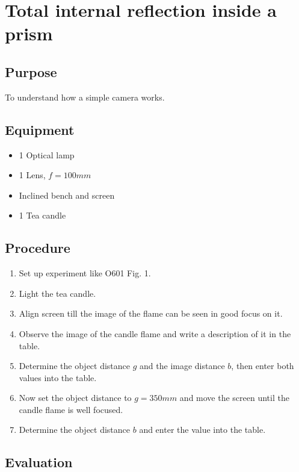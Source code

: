 \documentclass[12pt]{article}
\begin{document}
\section*{Total internal reflection inside a prism}

\subsection*{Purpose}

To understand how a simple camera works.

\subsection*{Equipment}

\begin{itemize}
\item 1 Optical lamp
\item 1 Lens, $f=100 mm$
\item Inclined bench and screen
\item 1 Tea candle
\end{itemize}

\subsection*{Procedure}

\begin{enumerate}
\item Set up experiment like O601 Fig. 1.
\item Light the tea candle.
\item Align screen till the image of the flame can be seen in good focus on it.
\item Observe the image of the candle flame and write a description of it in the table.
\item Determine the object distance $g$ and the image distance $b$, then enter both values into the table.
\item Now set the object distance to $g=350mm$ and move the screen until the candle flame is well focused.
\item Determine the object distance $b$ and enter the value into the table.
\end{enumerate}

\subsection*{Evaluation}
\end{document}
